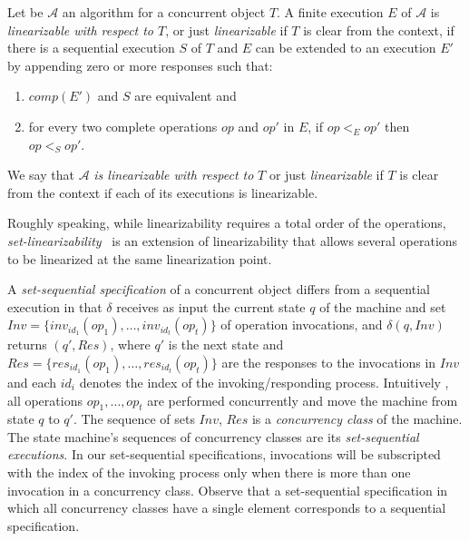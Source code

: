 \begin{definition}
Let be \(\mathcal{A}\) an algorithm for a concurrent object \(T\). A finite execution \(E\) of \(\mathcal{A}\) is \emph{linearizable with respect to \(T\)}, or just \emph{linearizable} if \(T\) is clear from the context, if there is a sequential execution \(S\) of \(T\) and \(E\) can be extended to an execution \(E'\) by appending zero or more responses such that:

\begin{enumerate}
    \item \(comp(E')\) and \(S\) are equivalent and
    \item for every two complete operations \(op\) and \(op'\) in \(E\), if \(op <_E op'\) then \(op <_S op'\).
\end{enumerate}

We say that \(\mathcal{A}\) \emph{is linearizable with respect to} \(T\) or just \emph{linearizable} if \(T\) is clear from the context if each of its executions is linearizable.
\end{definition}

Roughly speaking, while linearizability requires a total order of the operations, \emph{set-linearizability}~\cite{DBLP_journals_jacm_CastanedaRR18, DBLP_conf_podc_Neiger94} is an extension of linearizability that allows several operations to be linearized at the same linearization point.

A \emph{set-sequential specification} of a concurrent object differs from a sequential execution in that \(\delta\) receives as input the current state \(q\) of the machine and set \(Inv = \{inv_{id_1}(op_1), \ldots, inv_{id_t}(op_t)\}\) of operation invocations, and \(\delta(q, Inv)\) returns \((q', Res)\), where \(q'\) is the next state and \(Res = \{res_{id_1}(op_1), \ldots, res_{id_t}(op_t)\}\) are the responses to the invocations in \(Inv\) and each \(id_i\) denotes the index of the invoking/responding process. Intuitively , all operations \(op_1, \ldots, op_t\) are performed concurrently and move the machine from state \(q\) to \(q'\). The sequence of sets \(Inv\), \(Res\) is a \emph{concurrency class} of the machine. The state machine's sequences of concurrency classes are its \emph{set-sequential executions}. In our set-sequential specifications, invocations will be subscripted with the index of the invoking process only when there is more than one invocation in a concurrency class. Observe that a set-sequential specification in which all concurrency classes have a single element corresponds to a sequential specification.

